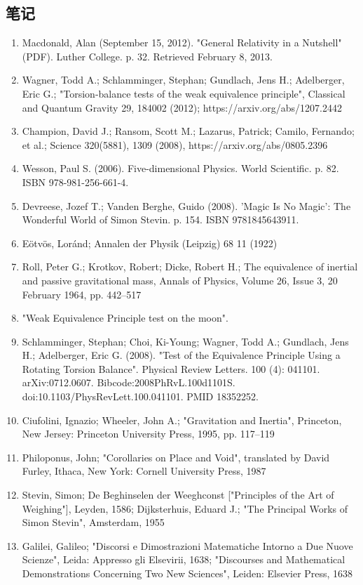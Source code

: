 \subsection{笔记}

\begin{enumerate}
\item Macdonald, Alan (September 15, 2012). "General Relativity in a Nutshell" (PDF). Luther College. p. 32. Retrieved February 8, 2013.
\item Wagner, Todd A.; Schlamminger, Stephan; Gundlach, Jens H.; Adelberger, Eric G.; "Torsion-balance tests of the weak equivalence principle", Classical and Quantum Gravity 29, 184002 (2012); https://arxiv.org/abs/1207.2442
\item Champion, David J.; Ransom, Scott M.; Lazarus, Patrick; Camilo, Fernando; et al.; Science 320(5881), 1309 (2008), https://arxiv.org/abs/0805.2396
\item Wesson, Paul S. (2006). Five-dimensional Physics. World Scientific. p. 82. ISBN 978-981-256-661-4.
\item Devreese, Jozef T.; Vanden Berghe, Guido (2008). 'Magic Is No Magic': The Wonderful World of Simon Stevin. p. 154. ISBN 9781845643911.
\item Eötvös, Loránd; Annalen der Physik (Leipzig) 68 11 (1922)
\item Roll, Peter G.; Krotkov, Robert; Dicke, Robert H.; The equivalence of inertial and passive gravitational mass, Annals of Physics, Volume 26, Issue 3, 20 February 1964, pp. 442–517
\item "Weak Equivalence Principle test on the moon".
\item Schlamminger, Stephan; Choi, Ki-Young; Wagner, Todd A.; Gundlach, Jens H.; Adelberger, Eric G. (2008). "Test of the Equivalence Principle Using a Rotating Torsion Balance". Physical Review Letters. 100 (4): 041101. arXiv:0712.0607. Bibcode:2008PhRvL.100d1101S. doi:10.1103/PhysRevLett.100.041101. PMID 18352252.
\item Ciufolini, Ignazio; Wheeler, John A.; "Gravitation and Inertia", Princeton, New Jersey: Princeton University Press, 1995, pp. 117–119
\item Philoponus, John; "Corollaries on Place and Void", translated by David Furley, Ithaca, New York: Cornell University Press, 1987
\item Stevin, Simon; De Beghinselen der Weeghconst ["Principles of the Art of Weighing"], Leyden, 1586; Dijksterhuis, Eduard J.; "The Principal Works of Simon Stevin", Amsterdam, 1955
\item Galilei, Galileo; "Discorsi e Dimostrazioni Matematiche Intorno a Due Nuove Scienze", Leida: Appresso gli Elsevirii, 1638; "Discourses and Mathematical Demonstrations Concerning Two New Sciences", Leiden: Elsevier Press, 1638

\end{enumerate}
